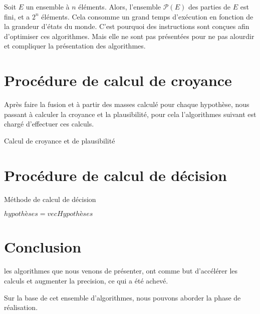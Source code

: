 Soit $E$ un ensemble à $n$ éléments. Alors, l'ensemble $\mathcal{P}(E)$ des parties de $E$ est fini, et a \textbf{$2^n$} éléments.
 \newpage
\vspace{4em}
Cela consomme un grand temps d'exécution en fonction de la grandeur d'états du monde. C'est pourquoi des instructions sont conçues afin  d'optimiser ces algorithmes. Mais elle ne sont pas présentées pour ne pas alourdir et compliquer la présentation des algorithmes.
\vspace{2em}
\section{Procédure de calcul de croyance}
\vspace{2em}

Après faire la fusion et à partir des masses calculé pour chaque hypothèse, nous passant à calculer la croyance et la plausibilité, pour cela l'algorithmes suivant est chargé d'effectuer ces calculs. 

\begin{algorithm}[H]
\caption{Calcul de croyance et de plausibilité}
\BlankLine
{}
\BlankLine 
\Begin

\end{algorithm}
\section{Procédure de calcul de décision}
\begin{algorithm}[H]
\caption{Méthode de calcul de décision}
\BlankLine
{}
\BlankLine 
$hypothèses = vecHypothèses$
\end{algorithm}
{}
\section*{Conclusion}
les algorithmes que nous venons de présenter, ont comme but d'accélérer les calculs et augmenter la precision, ce qui a été achevé. 

Sur la base de cet ensemble d'algorithmes, nous pouvons aborder la phase de réalisation.  